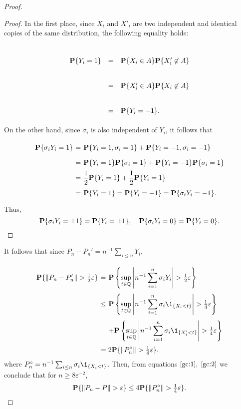 \begin{proof}
  \begin{proof} In the first place, since $X_i$ and $X'_i$ are two independent and identical copies of the same distribution, the following equality holds: 

    \[ \begin{array}{rcl}
      \P\{Y_i = 1\} & = & \P\{X_i \in A\} \P\{X'_i \not\in A\}\\
      & = &  \P\{X'_i \in A\} \P\{X_i \not\in A\}\\
      & = & \P\{Y_i = -1\}.
    \end{array} \]
  On the other hand, since $\sigma_i$ is also independent of $Y_i$, it follows that
  \[ \everymath{\displaystyle}\arraycolsep=1.8pt\def\arraystretch{1.8}
  \begin{array}{rcl}
    \P\{\sigma_i Y_i = 1\} & = & \P\{Y_i = 1, \sigma_i = 1\} + \P\{Y_i = -1, \sigma_i = -1\}\\
    & = & \P\{Y_i = 1\} \P\{\sigma_i = 1\} + \P\{Y_i = -1\} \P\{\sigma_i = 1\}\\
    & = & \frac{1}{2} \P\{Y_i = 1\} + \frac{1}{2} \P\{Y_i = 1\}\\
    & = & \P\{Y_i = 1\} = \P\{Y_i = -1\} = \P\{\sigma_i Y_i = -1\}.
  \end{array}
    \]
    Thus,
    \[  \P\{\sigma_i Y_i = \pm 1\} = \P\{Y_i = \pm 1\},\hspace*{1em}  \P\{\sigma_i Y_i = 0\} = \P\{ Y_i = 0\}. \] 
  \end{proof}
  
  It follows that since $P_n - P_n' = n^{-1} \sum_{i \leq n} Y_i$,
  \begin{equation}
    \label{gc:2} 
    \everymath{\displaystyle}\arraycolsep=1.8pt\def\arraystretch{3}
  \begin{array}{rcl}
    \P\{\|P_n - P_n'\| > \tfrac{1}{2}\varepsilon\} & = & \P\left\{\sup_{t\in \Q} \left|n^{-1}\sum_{i = 1}^n \sigma_i Y_i\right| >\tfrac{1}{2}\varepsilon \right\}\\
    & \leq & \P\left\{\sup_{t\in \Q} \left|n^{-1}\sum_{i = 1}^n \sigma_i\1_{\{ X_i < t\}}\right| >\tfrac{1}{4}\varepsilon \right\}\\
    & & + \P\left\{\sup_{t\in \Q} \left|n^{-1}\sum_{i = 1}^n \sigma_i\1_{\{ X_i' < t\}}\right| >\tfrac{1}{4}\varepsilon \right\}
  \end{array}
  \end{equation}
  \[ = 2\P\{\|P_n^\circ\| > \tfrac{1}{4} \varepsilon\}.  \] 
  where $P_n^\circ = n^{-1}\sum_{i\leq n} \sigma_i \1_{\{ X_i < t\}}$. Then, from equations $\ref{gc:1},\;\ref{gc:2}$ we conclude that for $n \geq 8\varepsilon^{-2}$,
  \[ \P\{\|P_n-P\| > \varepsilon\} \leq 4 \P\{\|P_n^\circ\|> \tfrac{1}{4}\varepsilon\}.\]


\end{proof}
